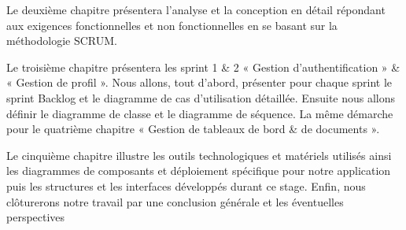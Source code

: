\medskip
Le deuxième chapitre présentera l'analyse et la conception en détail répondant aux exigences fonctionnelles et non fonctionnelles en se basant sur la méthodologie SCRUM.

\medskip
Le troisième chapitre présentera les sprint 1 \& 2 « Gestion d'authentification » \& « Gestion de profil ». Nous allons, tout d'abord, présenter pour chaque sprint le sprint Backlog et le diagramme de cas d'utilisation détaillée. Ensuite nous allons définir le diagramme de classe et le diagramme de séquence. La même démarche pour le quatrième chapitre « Gestion de tableaux de bord \& de documents ».
\medskip

Le cinquième chapitre illustre les outils technologiques et matériels utilisés ainsi les diagrammes de composants et déploiement spécifique pour notre application puis les structures et les interfaces développés durant ce stage.
\medskip
Enfin, nous clôturerons notre travail par une conclusion générale et les éventuelles perspectives

\vspace{1cm}



